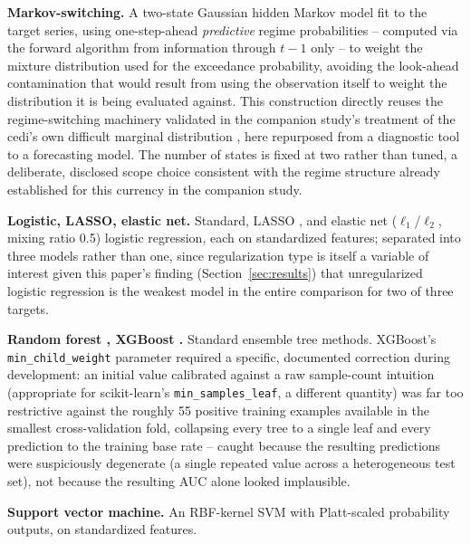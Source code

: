 \documentclass[final,3p,times,authoryear]{elsarticle}
\begin{document}
\textbf{Markov-switching.} A two-state Gaussian hidden Markov model
fit to the target series, using one-step-ahead \emph{predictive} regime
probabilities -- computed via the forward algorithm from information
through $t-1$ only -- to weight the mixture distribution used for the
exceedance probability, avoiding the look-ahead contamination that would
result from using the observation itself to weight the distribution it
is being evaluated against. This construction directly reuses the
regime-switching machinery validated in the companion study's treatment
of the cedi's own difficult marginal distribution \citep{nelson2026tail},
here repurposed from a diagnostic tool to a forecasting model. The
number of states is fixed at two rather than tuned, a deliberate,
disclosed scope choice consistent with the regime structure already
established for this currency in the companion study.

\textbf{Logistic, LASSO, elastic net.} Standard, LASSO
\citep[$\ell_1$;][]{tibshirani1996}, and elastic net ($\ell_1$/$\ell_2$,
mixing ratio 0.5) logistic regression,
each on standardized features; separated into three models rather than
one, since regularization type is itself a variable of interest given
this paper's finding (Section~\ref{sec:results}) that unregularized
logistic regression is the weakest model in the entire comparison for
two of three targets.

\textbf{Random forest \citep{breiman2001}, XGBoost \citep{chenguestrin2016}.}
Standard ensemble tree methods.
XGBoost's \texttt{min\_child\_weight} parameter required a specific,
documented correction during development: an initial value calibrated
against a raw sample-count intuition (appropriate for scikit-learn's
\texttt{min\_samples\_leaf}, a different quantity) was far too
restrictive against the roughly 55 positive training examples available
in the smallest cross-validation fold, collapsing every tree to a single
leaf and every prediction to the training base rate -- caught because
the resulting predictions were suspiciously degenerate (a single
repeated value across a heterogeneous test set), not because the
resulting AUC alone looked implausible.

\textbf{Support vector machine.} An RBF-kernel SVM with Platt-scaled
probability outputs, on standardized features.
\end{document}
